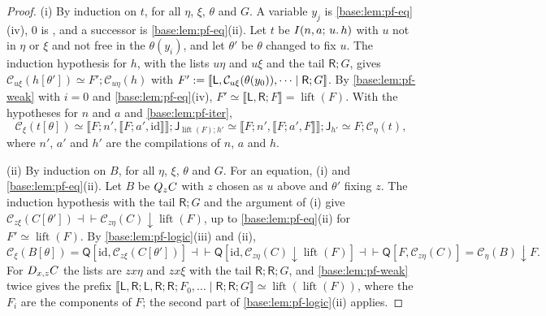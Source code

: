 \begin{proof}
(i) By induction on $t$, for all $\eta$, $\xi$, $\theta$ and $G$.  A variable
$y_j$ is \cref{base:lem:pf-eq}(iv), $0$ is , and a successor is
\cref{base:lem:pf-eq}(ii).  Let $t$ be $I(n,a;\,u.\,h)$ with $u$ not in
$\eta$ or $\xi$ and not free in the $\theta(y_i)$, and let $\theta'$ be
$\theta$ changed to fix $u$.  The induction hypothesis for $h$, with the
lists $u\eta$ and $u\xi$ and the tail $\mathsf R;G$, gives
$\mathcal C_{u\xi}(h[\theta'])\simeq F';\mathcal C_{u\eta}(h)$ with
$F'\mathrel{:=}[\![\mathsf L,\mathcal C_{u\xi}(\theta(y_0)),\dots\mid\mathsf R;G]\!]$.
By \cref{base:lem:pf-weak} with $i=0$ and \cref{base:lem:pf-eq}(iv),
$F'\simeq\llbracket\mathsf L,\mathsf R;F\rrbracket=\operatorname{lift}(F)$.
With the hypotheses for $n$ and $a$ and \cref{base:lem:pf-iter},
\[
 \mathcal C_\xi(t[\theta])\simeq
 \llbracket F;n',\llbracket F;a',\mathrm{id}\rrbracket\rrbracket;
 \mathsf J_{\operatorname{lift}(F);h'}\simeq
 \llbracket F;n',\llbracket F;a',F\rrbracket\rrbracket;\mathsf J_{h'}\simeq
 F;\mathcal C_\eta(t),
\]
where $n'$, $a'$ and $h'$ are the compilations of $n$, $a$ and $h$.

(ii) By induction on $B$, for all $\eta$, $\xi$, $\theta$ and $G$.  For an
equation, (i) and \cref{base:lem:pf-eq}(ii).  Let $B$ be $Q_{z}C$ with $z$
chosen as $u$ above and $\theta'$ fixing $z$.  The induction hypothesis
with the tail $\mathsf R;G$ and the argument of (i) give
$\mathcal C_{z\xi}(C[\theta'])\dashv\vdash
\mathcal C_{z\eta}(C){\downarrow}\operatorname{lift}(F)$, up to
\cref{base:lem:pf-eq}(ii) for $F'\simeq\operatorname{lift}(F)$.  By
\cref{base:lem:pf-logic}(iii) and (ii),
\[
 \mathcal C_\xi(B[\theta])=\mathsf Q[\mathrm{id},\mathcal C_{z\xi}(C[\theta'])]
 \dashv\vdash\mathsf Q[\mathrm{id},\mathcal C_{z\eta}(C){\downarrow}\operatorname{lift}(F)]
 \dashv\vdash\mathsf Q[F,\mathcal C_{z\eta}(C)]=\mathcal C_\eta(B){\downarrow}F.
\]
For $D_{x,z}C$ the lists are $zx\eta$ and $zx\xi$ with the tail
$\mathsf R;\mathsf R;G$, and \cref{base:lem:pf-weak} twice gives the prefix
$\llbracket\mathsf L,\mathsf R;\mathsf L,\mathsf R;\mathsf R;F_0,\dots\mid
\mathsf R;\mathsf R;G\rrbracket\simeq
\operatorname{lift}(\operatorname{lift}(F))$, where the $F_i$ are the
components of $F$; the second part of \cref{base:lem:pf-logic}(ii) applies.
\end{proof}

